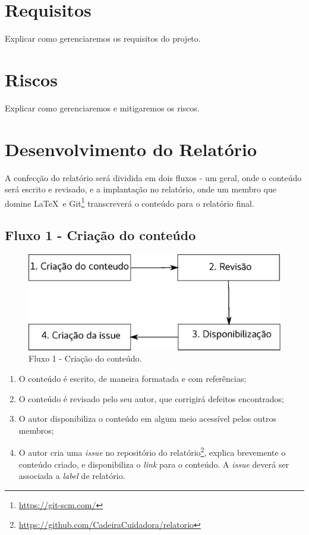 \section{Requisitos}

Explicar como gerenciaremos os requisitos do projeto.

\section{Riscos}

Explicar como gerenciaremos e mitigaremos os riscos.

\section{Desenvolvimento do Relatório}

A confecção do relatório será dividida em dois fluxos - um geral, onde o
conteúdo será escrito e revisado, e a implantação no relatório, onde um
membro que domine \LaTeX\ e
Git\footnote{\url{https://git-scm.com/}} transcreverá o conteúdo para o
relatório final.

\subsection{Fluxo 1 - Criação do conteúdo}

\begin{figure}[H]
  \centering
    \includegraphics[width=\textwidth]{figuras/fluxo1.eps}
  \caption{Fluxo 1 - Criação do conteúdo.}
  \label{fig:fluxo1}
\end{figure}

\begin{enumerate}
  \item O conteúdo é escrito, de maneira formatada e com referências;
  \item O conteúdo é revisado pelo seu autor, que corrigirá defeitos encontrados;
  \item O autor disponibiliza o conteúdo em algum meio acessível pelos outros membros;
  \item O autor cria uma \textit{issue} no repositório do
    relatório\footnote{\url{https://github.com/CadeiraCuidadora/relatorio}}, explica brevemente
    o conteúdo criado, e disponibiliza o \textit{link} para o conteúdo. A \textit{issue} deverá ser associada a \textit{label} de relatório.
\end{enumerate}

